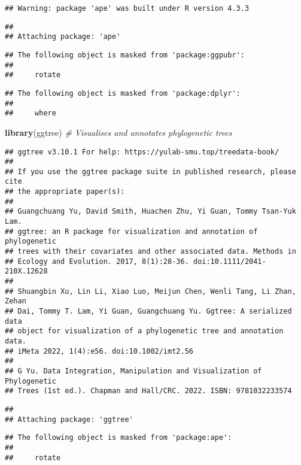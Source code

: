 \documentclass[
]{article}
\newenvironment{Shaded}{\begin{snugshade}}{\end{snugshade}}
\newcommand{\CommentTok}[1]{\textcolor[rgb]{0.56,0.35,0.01}{\textit{#1}}}
\newcommand{\FunctionTok}[1]{\textcolor[rgb]{0.13,0.29,0.53}{\textbf{#1}}}
\newcommand{\NormalTok}[1]{#1}
\begin{document}
\begin{verbatim}
## Warning: package 'ape' was built under R version 4.3.3
\end{verbatim}

\begin{verbatim}
## 
## Attaching package: 'ape'
\end{verbatim}

\begin{verbatim}
## The following object is masked from 'package:ggpubr':
## 
##     rotate
\end{verbatim}

\begin{verbatim}
## The following object is masked from 'package:dplyr':
## 
##     where
\end{verbatim}

\begin{Shaded}
\begin{Highlighting}[]
\FunctionTok{library}\NormalTok{(ggtree)           }\CommentTok{\# Visualises and annotates phylogenetic trees}
\end{Highlighting}
\end{Shaded}

\begin{verbatim}
## ggtree v3.10.1 For help: https://yulab-smu.top/treedata-book/
## 
## If you use the ggtree package suite in published research, please cite
## the appropriate paper(s):
## 
## Guangchuang Yu, David Smith, Huachen Zhu, Yi Guan, Tommy Tsan-Yuk Lam.
## ggtree: an R package for visualization and annotation of phylogenetic
## trees with their covariates and other associated data. Methods in
## Ecology and Evolution. 2017, 8(1):28-36. doi:10.1111/2041-210X.12628
## 
## Shuangbin Xu, Lin Li, Xiao Luo, Meijun Chen, Wenli Tang, Li Zhan, Zehan
## Dai, Tommy T. Lam, Yi Guan, Guangchuang Yu. Ggtree: A serialized data
## object for visualization of a phylogenetic tree and annotation data.
## iMeta 2022, 1(4):e56. doi:10.1002/imt2.56
## 
## G Yu. Data Integration, Manipulation and Visualization of Phylogenetic
## Trees (1st ed.). Chapman and Hall/CRC. 2022. ISBN: 9781032233574
\end{verbatim}

\begin{verbatim}
## 
## Attaching package: 'ggtree'
\end{verbatim}

\begin{verbatim}
## The following object is masked from 'package:ape':
## 
##     rotate
\end{verbatim}
\end{document}
